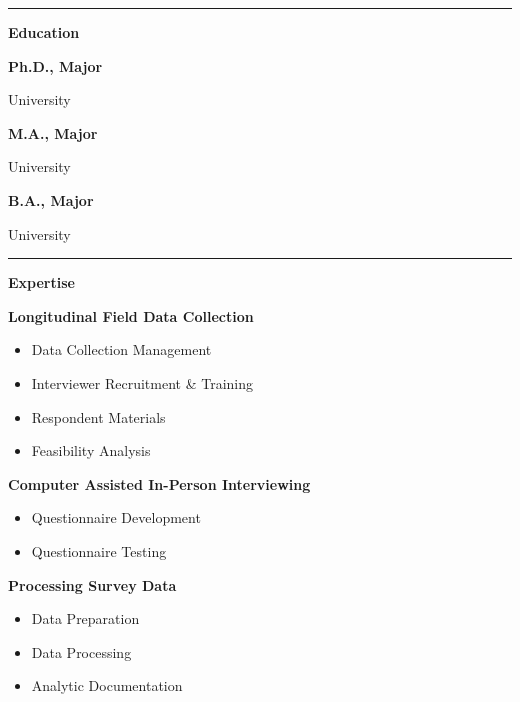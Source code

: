 \documentclass[10pt]{article}
\providecommand{\robotoLight}{\fontseries{l}\selectfont}
\providecommand{\robotoBold}{\bfseries}
\newcommand{\SidebarHeading}[1]{%
    \vspace{14pt}
    {\color{NORCOrange}\rule{0.35in}{2.5pt}}\par
    \vspace{6pt}
    {\fontsize{14}{12}\selectfont
    \color{NORCOrange}\robotoBold{#1}\par}
    \vspace{12pt}
}
\newcommand{\Degree}[2]{%
  {\robotoBold{#1}\par}
  {\robotoLight\small #2\par}
  \vspace{12pt}
}
\newcommand{\SkillGroup}[2]{%
  {\robotoBold{#1}}\par
  \begin{itemize}[leftmargin=*]
    #2
  \end{itemize}
  \vspace{9pt}
}
\begin{document}
\hfill
\begin{minipage}[t]{0.31\textwidth}
  \SidebarHeading{Education}
  \Degree{Ph.D., Major}{University}
  \Degree{M.A., Major}{University}
  \Degree{B.A., Major}{University}

  \SidebarHeading{Expertise}

  \SkillGroup{Longitudinal Field Data Collection}{
    \item Data Collection Management
    \item Interviewer Recruitment \& Training
    \item Respondent Materials
    \item Feasibility Analysis
  }

  \SkillGroup{Computer Assisted In-Person Interviewing}{
    \item Questionnaire Development
    \item Questionnaire Testing
  }

  \SkillGroup{Processing Survey Data}{
    \item Data Preparation
    \item Data Processing
    \item Analytic Documentation
  }
\end{minipage}

\newpage
\end{document}
